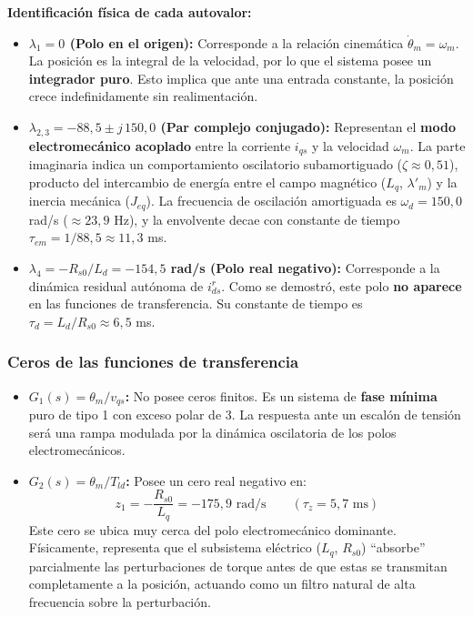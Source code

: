\documentclass[12pt, a4paper,journal, onecolumn, compsoc]{IEEEtran}
\begin{document}
\textbf{Identificación física de cada autovalor:} \mbox{}

\begin{itemize}
    \item \textbf{$\lambda_1 = 0$ (Polo en el origen):} Corresponde a la relación cinemática $\dot{\theta}_m = \omega_m$. La posición es la integral de la velocidad, por lo que el sistema posee un \textbf{integrador puro}. Esto implica que ante una entrada constante, la posición crece indefinidamente sin realimentación.

    \item \textbf{$\lambda_{2,3} = -88{,}5 \pm j\,150{,}0$ (Par complejo conjugado):} Representan el \textbf{modo electromecánico acoplado} entre la corriente $i_{qs}$ y la velocidad $\omega_m$. La parte imaginaria indica un comportamiento oscilatorio subamortiguado ($\zeta \approx 0{,}51$), producto del intercambio de energía entre el campo magnético ($L_q$, $\lambda'_m$) y la inercia mecánica ($J_{eq}$). La frecuencia de oscilación amortiguada es $\omega_d = 150{,}0$ rad/s ($\approx 23{,}9$ Hz), y la envolvente decae con constante de tiempo $\tau_{em} = 1/88{,}5 \approx 11{,}3$ ms.

    \item \textbf{$\lambda_4 = -R_{s0}/L_d = -154{,}5$ rad/s (Polo real negativo):} Corresponde a la dinámica residual autónoma de $i_{ds}^r$. Como se demostró, este polo \textbf{no aparece} en las funciones de transferencia. Su constante de tiempo es $\tau_d = L_d/R_{s0} \approx 6{,}5$ ms.
\end{itemize}

\subsubsection{Ceros de las funciones de transferencia}

\begin{itemize}
    \item \textbf{$G_1(s) = \theta_m / v_{qs}$:} No posee ceros finitos. Es un sistema de \textbf{fase mínima} puro de tipo 1 con exceso polar de 3. La respuesta ante un escalón de tensión será una rampa modulada por la dinámica oscilatoria de los polos electromecánicos.

    \item \textbf{$G_2(s) = \theta_m / T_{ld}$:} Posee un cero real negativo en:
    \begin{equation}
        z_1 = -\frac{R_{s0}}{L_q} = -175{,}9 \text{ rad/s} \qquad (\tau_z = 5{,}7 \text{ ms})
    \end{equation}
    Este cero se ubica muy cerca del polo electromecánico dominante. Físicamente, representa que el subsistema eléctrico ($L_q$, $R_{s0}$) ``absorbe'' parcialmente las perturbaciones de torque antes de que estas se transmitan completamente a la posición, actuando como un filtro natural de alta frecuencia sobre la perturbación.
\end{itemize}
\end{document}
